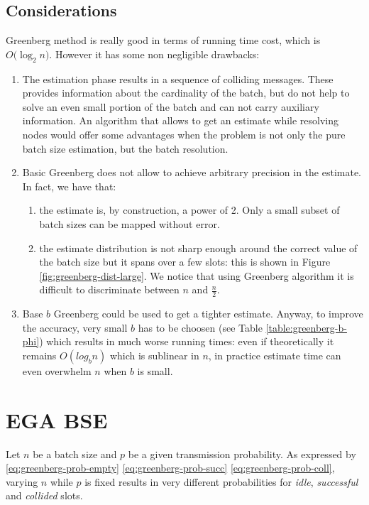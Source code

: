 \documentclass[11pt,a4paper,twoside,openright]{book}
\begin{document}
\subsection{Considerations}
Greenberg method is really good in terms of running time cost, which is $O\bigl(\log_{2}n\bigr)$. However it has some non negligible drawbacks:
\begin{enumerate}[\bf a)]
\item The estimation phase results in a sequence of colliding messages. These provides information about the cardinality of the batch, but do not help to solve an even small portion of the batch and can not carry auxiliary information. An algorithm that allows to get an estimate while resolving nodes would offer some advantages when the problem is not only the pure batch size estimation, but the batch resolution.
\item Basic Greenberg does not allow to achieve arbitrary precision in the estimate. In fact, we have that:
	\begin{enumerate}[\it i.]
		\item  the estimate is, by construction, a power of 2. Only a small subset of batch sizes can be mapped without error.
		\item the estimate distribution is not sharp enough around the correct value of the batch size but it spans over a few slots: this is shown in Figure \ref{fig:greenberg-dist-large}. We notice that using Greenberg algorithm it is difficult to discriminate between $n$ and $\displaystyle \frac{n}{2}$. 
	\end{enumerate}
\item Base $b$ Greenberg could  be used to get a tighter estimate. Anyway, to improve the accuracy, very small $b$ has to be choosen (see Table \ref{table:greenberg-b-phi}) which results in much worse running times: even if theoretically it remains $O(log_{b}n)$ which is sublinear in $n$, in practice estimate time can even overwhelm $n$ when $b$ is small.
\end{enumerate}

\section{EGA BSE}

Let $n$ be a batch size and $p$ be a given transmission probability. As expressed by \eqref{eq:greenberg-prob-empty} \eqref{eq:greenberg-prob-succ} \eqref{eq:greenberg-prob-coll}, varying $n$ while $p$ is fixed results in very different probabilities for \emph{idle}, \emph{successful} and \emph{collided} slots.
\end{document}
